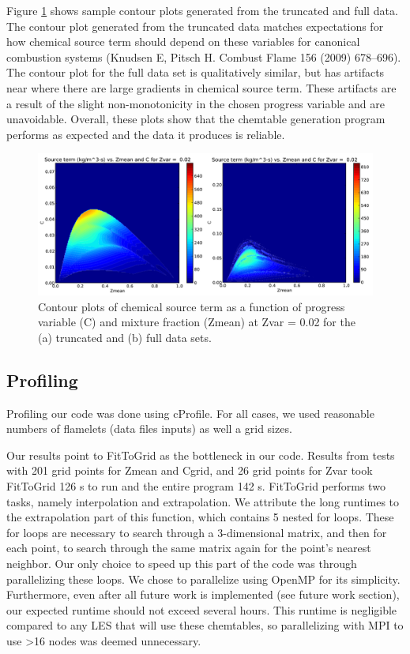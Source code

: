 \documentclass[11pt]{article}
\begin{document}
Figure \ref{fig:ya_yb} shows sample contour plots generated from the
truncated and full data. The contour plot generated from the truncated
data matches expectations for how chemical source term should depend
on these variables for canonical combustion systems (Knudsen E, Pitsch
H. Combust Flame 156 (2009) 678–696). The contour plot for the full
data set is qualitatively similar, but has artifacts near where there
are large gradients in chemical source term. These artifacts are a
result of the slight non-monotonicity in the chosen progress variable
and are unavoidable. Overall, these plots show that the chemtable
generation program performs as expected and the data it produces is
reliable.

\begin{figure} [h]
\centering
\includegraphics[width=\textwidth]{ya_yb}
\caption{\label{fig:ya_yb} Contour plots of chemical source term as a
  function of progress variable (C) and mixture fraction (Zmean) at
  Zvar = 0.02 for the (a) truncated and (b) full data sets.}
\end{figure}

\subsection{Profiling}
Profiling our code was done using cProfile. For all cases, we used
reasonable numbers of flamelets (data files inputs) as well a grid
sizes.

Our results point to FitToGrid as the bottleneck in our code. Results
from tests with 201 grid points for Zmean and Cgrid, and 26 grid
points for Zvar took FitToGrid 126 s to run and the entire program 142
s. FitToGrid performs two tasks, namely interpolation and
extrapolation. We attribute the long runtimes to the extrapolation
part of this function, which contains 5 nested for loops. These for
loops are necessary to search through a 3-dimensional matrix, and then
for each point, to search through the same matrix again for the
point’s nearest neighbor. Our only choice to speed up this part of the
code was through parallelizing these loops. We chose to parallelize
using OpenMP for its simplicity. Furthermore, even after all future
work is implemented (see future work section), our expected runtime
should not exceed several hours. This runtime is negligible compared
to any LES that will use these chemtables, so parallelizing with MPI
to use >16 nodes was deemed unnecessary.
\end{document}
